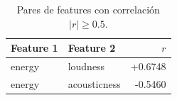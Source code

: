 \begin{table}[htbp]
\centering
\caption{Pares de features con correlación $|r| \geq 0.5$.}
\label{tab:high_correlations}
\begin{tabular}{llr}
\toprule
Feature 1 & Feature 2 & $r$ \\
\midrule
energy & loudness & +0.6748 \\
energy & acousticness & -0.5460 \\
\bottomrule
\end{tabular}
\end{table}